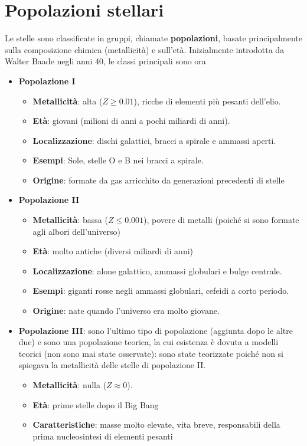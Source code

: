 \documentclass[a4paper, oneside]{book}
\begin{document}
\section{Popolazioni stellari}
Le stelle sono classificate in gruppi, chiamate \textbf{popolazioni}, basate principalmente sulla composizione chimica 
(metallicità) e sull'età. Inizialmente introdotta da Walter Baade negli anni 40, le classi principali sono ora
\begin{itemize}
    \item \textbf{Popolazione I}
    \begin{itemize}
        \item \textbf{Metallicità}: alta ($Z \geq 0.01$), ricche di elementi più pesanti dell'elio.
        \item \textbf{Età}: giovani (milioni di anni a pochi miliardi di anni).
        \item \textbf{Localizzazione}: dischi galattici, bracci a spirale e ammassi aperti.
        \item \textbf{Esempi}: Sole, stelle O e B nei bracci a spirale.
        \item \textbf{Origine}: formate da gas arricchito da generazioni precedenti di stelle
    \end{itemize}
    \item \textbf{Popolazione II}
    \begin{itemize}
        \item \textbf{Metallicità}: bassa ($Z \leq 0.001$), povere di metalli (poiché si sono formate agli albori dell'universo)
        \item \textbf{Età}: molto antiche (diversi miliardi di anni)
        \item \textbf{Localizzazione}: alone galattico, ammassi globulari e bulge centrale.
        \item \textbf{Esempi}: giganti rosse negli ammassi globulari, cefeidi a corto periodo.
        \item \textbf{Origine}: nate quando l'universo era molto giovane.
    \end{itemize}
    \item \textbf{Popolazione III}: sono l'ultimo tipo di popolazione (aggiunta dopo le altre due) e sono una popolazione teorica, 
    la cui esistenza è dovuta a modelli teorici (non sono mai state osservate): sono state teorizzate poiché non si spiegava la metallicità delle stelle 
    di popolazione II. 
    \begin{itemize}
        \item \textbf{Metallicità}: nulla ($Z \approx 0$).
        \item \textbf{Età}: prime stelle dopo il Big Bang
        \item \textbf{Caratteristiche}: masse molto elevate, vita breve, responsabili della prima nucleosintesi di elementi pesanti
    \end{itemize}
\end{itemize}
\end{document}
